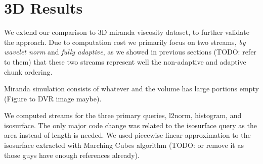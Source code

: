 \section{3D Results}
We extend our comparison to 3D miranda viscosity dataset, to further validate the approach.
Due to computation cost we primarily focus on two streams, {\em by wavelet norm} and {\em fully
adaptive}, as we showed in previous sections (TODO: refer to them) that these two streams represent
well the non-adaptive and adaptive chunk ordering.

Miranda simulation consists of whatever and the volume has large portions empty
(Figure to DVR image maybe).

We computed streams for the three primary queries, l2norm, histogram, and isosurface. The only
major code change was related to the isosurface query as the area instead of length is needed.
We used piecewise linear approximation to the isosurface extracted with Marching Cubes algorithm
(TODO: or remove it as those guys have enough references already).


